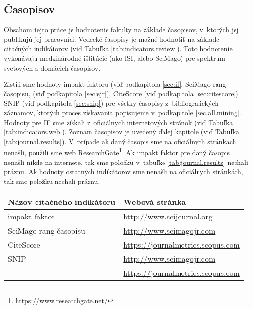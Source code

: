 \subsection{Časopisov}
\label{sec:journal.mining}

Obsahom tejto práce je hodnotenie fakulty na základe časopisov, v~ktorých jej
publikujú jej pracovníci. Vedecké časopisy je možné hodnotiť na základe
citačných indikátorov (viď Tabuľka \ref{tab:indicators.review}). Toto
hodnotenie vykonávajú medzinárodné ištitúcie (ako ISI, alebo SciMago) pre
spektrum svetových a domácich časopisov. 

Zistili sme hodnoty impakt faktoru (viď podkapitola \ref{sec:if}, SciMago rang
časopisu, (viď podkapitola \ref{sec:sjr}), CiteScore (viď podkapitola
\ref{sec:citescore}) SNIP (viď podkapitola \ref{sec:snip}) pre všetky časopisy
z~bibliografických záznamov, ktorých proces získavania popisujeme v~podkapitole
\ref{sec.all.mining}.  Hodnoty pre IF sme získali z~oficiálnych
internetových stránok (viď Tabuľka \ref{tab:indicators.web}).  Zoznam časopisov
je uvedený ďalej kapitole (viď Tabuľka \ref{tab:journal.results}).  V~prípade
ak daný časopis sme na oficiálnych stránkach nenašli, použili sme web
ResearchGate\footnote{\url{https://www.researchgate.net/}}.  Ak impakt faktor
pre daný časopis nenašli nikde na internete, tak sme položku v~tabuľke
\ref{tab:journal.results} nechali práznu.  Ak hodnoty ostatných indikátorov
sme nenašli na  oficiálnych stránkách, tak sme položku nechali práznu.

\begin{SCtable}
\centering\small
  \caption[Webové stránky citačných indikátorov na hodnotenie časopisov]
  {Zoznam citačných indikátorov na hodnotenie časopisov, s~odkazmi na oficiálne
  webové stránky}
\label{tab:indicators.web}
\begin{tabular}{ll}
  \toprule\noalign{\vspace{.3ex}}
  Názov citačného indikátoru      & Webová stránka\\[0.3ex]
  \midrule\noalign{\vspace{.5ex}}
  impakt faktor                   & {\footnotesize \url{http://www.scijournal.org}} \\[0.5ex]
  SciMago rang časopisu           & {\footnotesize \url{http://www.scimagojr.com}}\\[0.5ex]
  CiteScore                       & {\footnotesize \url{https://journalmetrics.scopus.com}} \\[0.5ex]
  SNIP                            & {\footnotesize \url{http://www.scimagojr.com}} \\[-0.25ex]
                                  & {\footnotesize \url{https://journalmetrics.scopus.com}} \\[0.5ex]
  \bottomrule
\end{tabular}
\end{SCtable}

